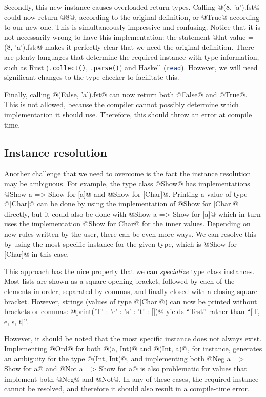Secondly, this new instance causes overloaded return types. Calling @(8, 'a').fst@ could now return @8@, according to the original definition, or @True@ according to our new one. This is simultaneously impressive and confusing. Notice that it is not necessarily wrong to have this implementation: the statement @Int value = (8, 'a').fst;@ makes it perfectly clear that we need the original definition. There are plenty languages that determine the required instance with type information, such as Rust (\lstinline[language=rust]|.collect()|, \lstinline[language=rust]|.parse()|) and Haskell (\lstinline[language=haskell]|read|). However, we will need significant changes to the type checker to facilitate this.

Finally, calling @(False, 'a').fst@ can now return both @False@ and @True@. This is not allowed, because the compiler cannot possibly determine which implementation it should use. Therefore, this should throw an error at compile time.

\subsection{Instance resolution}\label{challenge:instance_resolution}
Another challenge that we need to overcome is the fact the instance resolution may be ambiguous. For example, the type class @Show@ has implementations @Show a => Show for [a]@ and @Show for [Char]@. Printing a value of type @[Char]@ can be done by using the implementation of @Show for [Char]@ directly, but it could also be done with @Show a => Show for [a]@ which in turn uses the implementation @Show for Char@ for the inner values. Depending on new rules written by the user, there can be even more ways. We can resolve this by using the most specific instance for the given type, which is @Show for [Char]@ in this case.

This approach has the nice property that we can \textit{specialize} type class instances. Most lists are shown as a square opening bracket, followed by each of the elements in order, separated by commas, and finally closed with a closing square bracket. However, strings (values of type @[Char]@) can now be printed without brackets or commas: @print('T' : 'e' : 's' : 't' : [])@ yields ``Test'' rather than ``[T, e, s, t]''.

However, it should be noted that the most specific instance does not always exist. Implementing @Ord@ for both @(a, Int)@ and @(Int, a)@, for instance, generates an ambiguity for the type @(Int, Int)@, and implementing both @Neg a => Show for a@ and @Not a => Show for a@ is also problematic for values that implement both @Neg@ and @Not@. In any of these cases, the required instance cannot be resolved, and therefore it should also result in a compile-time error.

